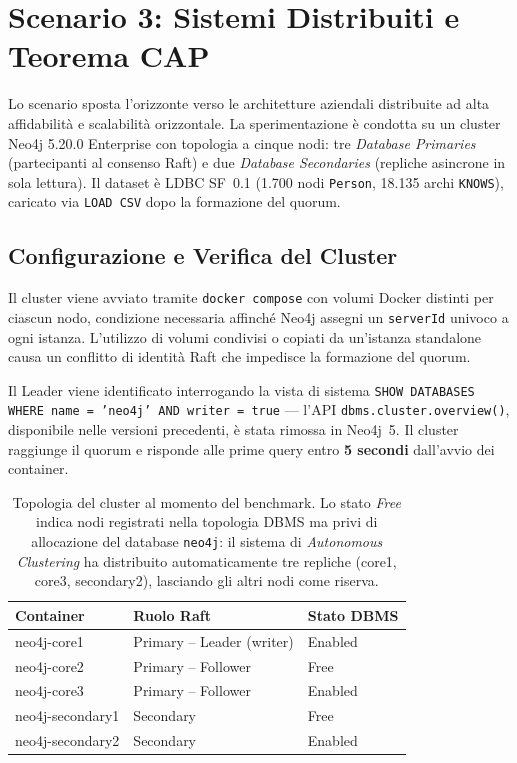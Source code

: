 \section{Scenario 3: Sistemi Distribuiti e Teorema CAP}
\label{sec:scenario3}
Lo scenario sposta l'orizzonte verso le architetture aziendali distribuite ad alta affidabilità e scalabilità orizzontale. La sperimentazione è condotta su un cluster Neo4j 5.20.0 Enterprise con topologia a cinque nodi: tre \textit{Database Primaries} (partecipanti al consenso Raft) e due \textit{Database Secondaries} (repliche asincrone in sola lettura). Il dataset è LDBC SF~0.1 (1.700 nodi \texttt{Person}, 18.135 archi \texttt{KNOWS}), caricato via \texttt{LOAD CSV} dopo la formazione del quorum.

\subsection{Configurazione e Verifica del Cluster}
Il cluster viene avviato tramite \texttt{docker compose} con volumi Docker distinti per ciascun nodo, condizione necessaria affinché Neo4j assegni un \texttt{serverId} univoco a ogni istanza. L'utilizzo di volumi condivisi o copiati da un'istanza standalone causa un conflitto di identità Raft che impedisce la formazione del quorum.

Il Leader viene identificato interrogando la vista di sistema \texttt{SHOW DATABASES WHERE name = 'neo4j' AND writer = true} — l'API \texttt{dbms.cluster.overview()}, disponibile nelle versioni precedenti, è stata rimossa in Neo4j~5. Il cluster raggiunge il quorum e risponde alle prime query entro \textbf{5 secondi} dall'avvio dei container.

\begin{table}[hbt!]
  \centering
  \begin{tabular}{lll}
    \hline
    \textbf{Container} & \textbf{Ruolo Raft} & \textbf{Stato DBMS} \\
    \hline
    neo4j-core1      & Primary – Leader (writer) & Enabled \\
    neo4j-core2      & Primary – Follower        & Free    \\
    neo4j-core3      & Primary – Follower        & Enabled \\
    neo4j-secondary1 & Secondary                 & Free    \\
    neo4j-secondary2 & Secondary                 & Enabled \\
    \hline
  \end{tabular}
  \caption{Topologia del cluster al momento del benchmark. Lo stato \textit{Free} indica nodi registrati nella topologia DBMS ma privi di allocazione del database \texttt{neo4j}: il sistema di \textit{Autonomous Clustering} ha distribuito automaticamente tre repliche (core1, core3, secondary2), lasciando gli altri nodi come riserva.}
  \label{tab:cluster_topology}
\end{table}

